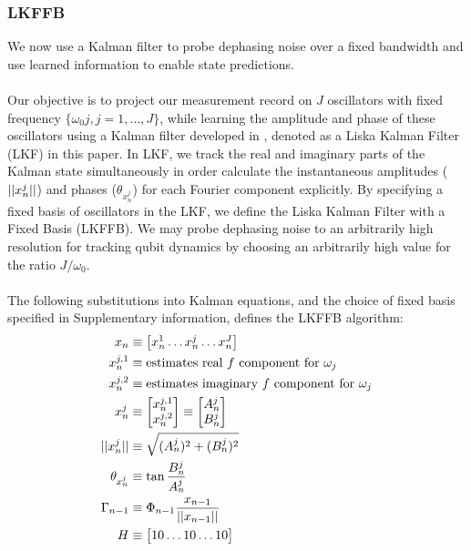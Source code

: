 \subsubsection{LKFFB}

We now use a Kalman filter to probe dephasing noise over a fixed bandwidth and use learned information to enable state predictions.
\\
\\
Our objective is to project our measurement record on $J$ oscillators with fixed frequency $\{ \omega_0 j, j = 1, \hdots, J \}$, while learning the amplitude and phase of these oscillators using a Kalman filter developed in \cite{livska2007}, denoted as a Liska Kalman Filter (LKF) in this paper. In LKF, we track the real and imaginary parts of the Kalman state  simultaneously in order calculate the instantaneous amplitudes ($||x^j_n||$) and phases ($\theta_{x^j_n}$)  for each Fourier component explicitly. By specifying a fixed basis of oscillators in the LKF, we define the Liska Kalman Filter with a Fixed Basis (LKFFB). We may probe dephasing noise to an arbitrarily high resolution for tracking qubit dynamics by choosing an arbitrarily high value for the ratio $J/\omega_0$.
\\
\\
The following substitutions into Kalman equations, and the choice of fixed basis specified in Supplementary information, defines the LKFFB algorithm:
\begin{align}
x_n & \equiv \begin{bmatrix} x^{1}_{n} \hdots x^{j}_{n} \hdots x^{J}_{n} \end{bmatrix} \\
x^{j,1}_{n} & \equiv \text{estimates real $f$ component for $\omega_j$} \\
x^{j,2}_{n} & \equiv \text{estimates imaginary $f$ component for $\omega_j$} \\
x^j_n &\equiv \begin{bmatrix} x^{j,1}_{n} \\ x^{j,2}_{n} \\ \end{bmatrix} \equiv \begin{bmatrix} A^j_{n} \\ B^j_{n}  \end{bmatrix}\\
||x^j_n|| & \equiv \sqrt{(A^j_{n})^2 + (B^j_{n})^2} \\
\theta_{x^j_n} & \equiv \tan{\frac{B^j_{n}}{A^j_{n}}} \\
\Gamma_{n-1} &\equiv \Phi_{n-1}\frac{x_{n-1}}{||x_{n-1}||}  \\
H & \equiv \begin{bmatrix} 1 0 \hdots 1 0 \hdots 1 0 \end{bmatrix}
\end{align}
